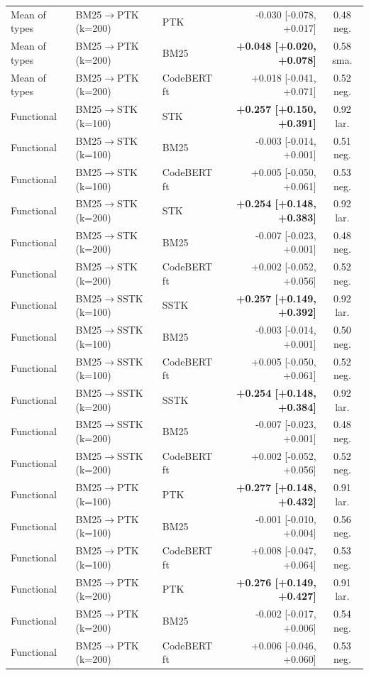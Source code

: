 \begin{table}[!htbp]
\begin{tabular}{lllrc}
Mean of types & BM25$\rightarrow$PTK (k=200) & PTK & -0.030 [-0.078, +0.017] & 0.48 neg. \\
Mean of types & BM25$\rightarrow$PTK (k=200) & BM25 & \textbf{+0.048 [+0.020, +0.078]} & 0.58 sma. \\
Mean of types & BM25$\rightarrow$PTK (k=200) & CodeBERT ft & +0.018 [-0.041, +0.071] & 0.52 neg. \\
\midrule
Functional & BM25$\rightarrow$STK (k=100) & STK & \textbf{+0.257 [+0.150, +0.391]} & 0.92 lar. \\
Functional & BM25$\rightarrow$STK (k=100) & BM25 & -0.003 [-0.014, +0.001] & 0.51 neg. \\
Functional & BM25$\rightarrow$STK (k=100) & CodeBERT ft & +0.005 [-0.050, +0.061] & 0.53 neg. \\
Functional & BM25$\rightarrow$STK (k=200) & STK & \textbf{+0.254 [+0.148, +0.383]} & 0.92 lar. \\
Functional & BM25$\rightarrow$STK (k=200) & BM25 & -0.007 [-0.023, +0.001] & 0.48 neg. \\
Functional & BM25$\rightarrow$STK (k=200) & CodeBERT ft & +0.002 [-0.052, +0.056] & 0.52 neg. \\
Functional & BM25$\rightarrow$SSTK (k=100) & SSTK & \textbf{+0.257 [+0.149, +0.392]} & 0.92 lar. \\
Functional & BM25$\rightarrow$SSTK (k=100) & BM25 & -0.003 [-0.014, +0.001] & 0.50 neg. \\
Functional & BM25$\rightarrow$SSTK (k=100) & CodeBERT ft & +0.005 [-0.050, +0.061] & 0.52 neg. \\
Functional & BM25$\rightarrow$SSTK (k=200) & SSTK & \textbf{+0.254 [+0.148, +0.384]} & 0.92 lar. \\
Functional & BM25$\rightarrow$SSTK (k=200) & BM25 & -0.007 [-0.023, +0.001] & 0.48 neg. \\
Functional & BM25$\rightarrow$SSTK (k=200) & CodeBERT ft & +0.002 [-0.052, +0.056] & 0.52 neg. \\
Functional & BM25$\rightarrow$PTK (k=100) & PTK & \textbf{+0.277 [+0.148, +0.432]} & 0.91 lar. \\
Functional & BM25$\rightarrow$PTK (k=100) & BM25 & -0.001 [-0.010, +0.004] & 0.56 neg. \\
Functional & BM25$\rightarrow$PTK (k=100) & CodeBERT ft & +0.008 [-0.047, +0.064] & 0.53 neg. \\
Functional & BM25$\rightarrow$PTK (k=200) & PTK & \textbf{+0.276 [+0.149, +0.427]} & 0.91 lar. \\
Functional & BM25$\rightarrow$PTK (k=200) & BM25 & -0.002 [-0.017, +0.006] & 0.54 neg. \\
Functional & BM25$\rightarrow$PTK (k=200) & CodeBERT ft & +0.006 [-0.046, +0.060] & 0.53 neg. \\
\bottomrule
\end{tabular}
\end{table}

